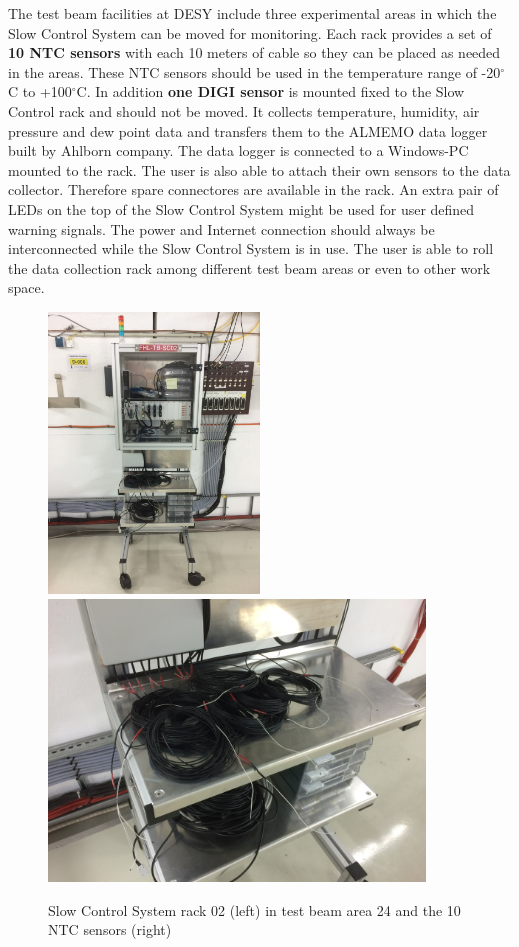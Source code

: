 \documentclass[a4paper,12pt]{scrartcl}
\begin{document}
The test beam facilities at DESY include three experimental areas in which the Slow Control System can be moved for monitoring. Each rack provides a set of \textbf{10 NTC sensors} with each 10 meters of cable so they can be placed as needed in the areas. These NTC sensors should be used in the temperature range of -20$^\circ$C to +100$^\circ$C. In addition \textbf{one DIGI sensor} is mounted fixed to the Slow Control rack and should not be moved. It collects temperature, humidity, air pressure and dew point data and transfers them to the ALMEMO data logger built by Ahlborn company. The data logger is connected to a Windows-PC mounted to the rack. The user is also able to attach their own sensors to the data collector. Therefore spare connectores are available in the rack.
An extra pair of LEDs on the top of the Slow Control System might be used for user defined warning signals. The power and Internet connection should always be interconnected while the Slow Control System is in use. The user is able to roll the data collection rack among different test beam areas or even to other work space. \\

\begin{figure} [H]
\includegraphics[width=5.6cm]{Rackganz.jpg} \includegraphics[width=10cm]{Sensoren.jpg}
\caption{Slow Control System rack 02 (left) in test beam area 24
and the 10  NTC sensors (right)}
\end{figure}
\end{document}

